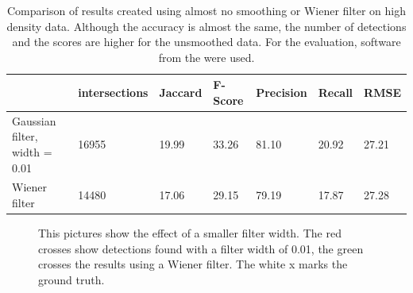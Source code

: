 \begin{table}
\caption{Comparison of results created using almost no smoothing or Wiener filter on high density data. Although the accuracy is almost the same, the number of detections and the scores are higher for the unsmoothed data. For the evaluation, software from the \cite{challenge} were used.}
\begin{tabular}{l|llllll}
&intersections&Jaccard&F-Score&Precision&Recall&RMSE\\ \hline
Gaussian filter, width = 0.01& 16955&19.99&33.26&81.10&20.92&27.21\\
Wiener filter& 14480&17.06&29.15&79.19&17.87&27.28
\end{tabular} \label{tabelbetterthansimplestorm}

\end{table}


\begin{figure}
\hfill
{}
	\caption{This pictures show the effect of a smaller filter width. The red crosses show detections found with a filter width of 0.01, the green crosses the results using a Wiener filter. The white x marks the ground truth.}
	\label{betterthansimplestorm}	
\end{figure}

